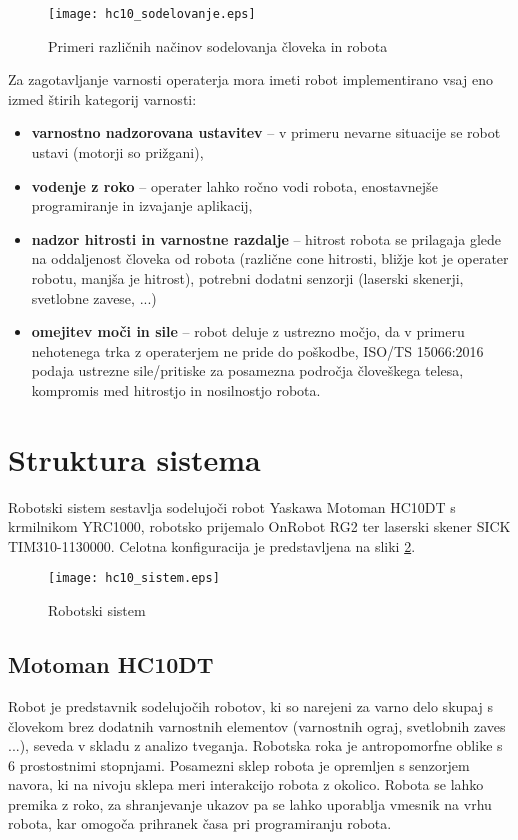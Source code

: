 \begin{figure}[!hbt]
	\centering
	\texttt{[image: hc10\_sodelovanje.eps]}
	\caption{Primeri različnih načinov sodelovanja človeka in robota}
	\label{fig:hc10_sodel}
\end{figure}


Za zagotavljanje varnosti operaterja mora imeti robot implementirano vsaj eno izmed štirih kategorij varnosti:
\begin{itemize}
	\item \textbf{varnostno nadzorovana ustavitev} -- v primeru nevarne situacije se robot ustavi (motorji so prižgani),
	\item \textbf{vodenje z roko}  -- operater lahko ročno vodi robota, enostavnejše programiranje in izvajanje aplikacij,
	\item \textbf{nadzor hitrosti in varnostne razdalje} -- hitrost robota se prilagaja glede na oddaljenost človeka od robota (različne cone hitrosti, bližje kot je operater robotu, manjša je hitrost), potrebni dodatni senzorji (laserski skenerji, svetlobne zavese, ...)
	\item \textbf{omejitev moči in sile} -- robot deluje z ustrezno močjo, da v primeru nehotenega trka z operaterjem ne pride do poškodbe, ISO/TS 15066:2016 podaja ustrezne sile/pritiske za posamezna področja človeškega telesa, kompromis med hitrostjo in nosilnostjo robota.
\end{itemize}


\section{Struktura sistema}

Robotski sistem sestavlja sodelujoči robot Yaskawa Motoman HC10DT s krmilnikom YRC1000, robotsko prijemalo OnRobot RG2 ter laserski skener SICK TIM310-1130000. Celotna konfiguracija je predstavljena na sliki \ref{fig:hc10_sistem}.

\begin{figure}[!hbt]
	\centering
	\texttt{[image: hc10\_sistem.eps]}
	\caption{Robotski sistem}
	\label{fig:hc10_sistem}
\end{figure}

\subsection{Motoman HC10DT}

Robot je predstavnik sodelujočih robotov, ki so narejeni za varno delo skupaj s človekom brez dodatnih varnostnih elementov (varnostnih ograj, svetlobnih zaves ...), seveda v skladu z analizo tveganja. Robotska roka je antropomorfne oblike s 6 prostostnimi stopnjami. Posamezni sklep robota je opremljen s senzorjem navora, ki na nivoju sklepa meri interakcijo robota z okolico. Robota se lahko premika z roko, za shranjevanje ukazov pa se lahko uporablja vmesnik na vrhu robota, kar omogoča prihranek časa pri programiranju robota.

